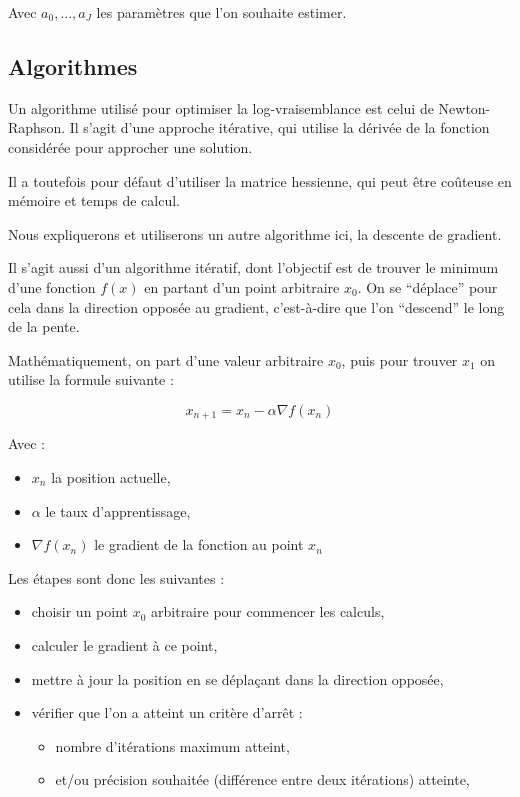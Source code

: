 \documentclass[10pt,french]{report}
\begin{document}
    Avec $a_0, \ldots, a_J$ les paramètres que l'on souhaite estimer.

	\subsection{Algorithmes}

    Un algorithme utilisé pour optimiser la log-vraisemblance est celui de Newton-Raphson. Il s'agit d'une approche itérative, qui utilise la dérivée de la fonction considérée pour approcher une solution.

    Il a toutefois pour défaut d'utiliser la matrice hessienne, qui peut être coûteuse en mémoire et temps de calcul.

    Nous expliquerons et utiliserons un autre algorithme ici, la descente de gradient.

    Il s'agit aussi d'un algorithme itératif, dont l'objectif est de trouver le minimum d'une fonction $f\left(x\right)$ en partant d'un point arbitraire $x_0$. On se \enquote{déplace} pour cela dans la direction opposée au gradient, c'est-à-dire que l'on \enquote{descend} le long de la pente.

    Mathématiquement, on part d'une valeur arbitraire $x_0$, puis pour trouver $x_1$ on utilise la formule suivante :

    \begin{equation}
        x_{n+1} = x_n - \alpha \nabla f\left(x_n\right)
    \end{equation}

    Avec :
    \begin{itemize}
        \item $x_n$ la position actuelle,
        \item $\alpha$ le taux d'apprentissage,
        \item $\nabla f\left(x_n\right)$ le gradient de la fonction au point $x_n$
    \end{itemize}

    Les étapes sont donc les suivantes :
    \begin{itemize}
        \item choisir un point $x_0$ arbitraire pour commencer les calculs,
        \item calculer le gradient à ce point,
        \item mettre à jour la position en se déplaçant dans la direction opposée,
        \item vérifier que l'on a atteint un critère d'arrêt :
        \begin{itemize}
            \item nombre d'itérations maximum atteint,
            \item et/ou précision souhaitée (différence entre deux itérations) atteinte,
        \end{itemize}
    \end{itemize}
\end{document}

